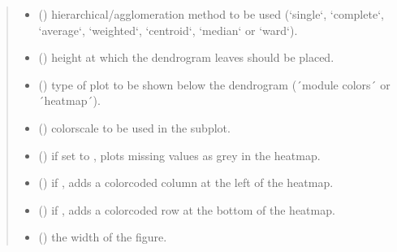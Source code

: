 \documentclass[letterpaper,10pt,english]{sphinxmanual}
\begin{document}
\begin{fulllineitems}
\begin{quote}
\begin{description}
\begin{itemize}
\item {} 
 () \textendash{} hierarchical/agglomeration method to be used (‘single‘, ‘complete‘, ‘average‘, ‘weighted‘, ‘centroid‘, ‘median‘ or ‘ward‘).

\item {} 
 () \textendash{} height at which the dendrogram leaves should be placed.

\item {} 
 () \textendash{} type of plot to be shown below the dendrogram (´module colors´ or ´heatmap´).

\item {} 
 () \textendash{} colorscale to be used in the subplot.

\item {} 
 () \textendash{} if set to , plots missing values as grey in the heatmap.

\item {} 
 () \textendash{} if , adds a color\sphinxhyphen{}coded column at the left of the heatmap.

\item {} 
 () \textendash{} if , adds a color\sphinxhyphen{}coded row at the bottom of the heatmap.

\item {} 
 () \textendash{} the width of the figure.


\end{itemize}
\end{description}
\end{quote}
\end{fulllineitems}
\end{document}
